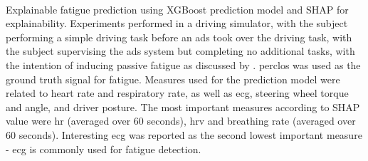 \documentclass[11pt, parskip=half*,twoside=false]{scrbook}
\begin{document}
\paragraph{\citet{zhouPredictingDriverFatigue2021}} Explainable fatigue prediction using XGBoost prediction model and SHAP for explainability.  Experiments performed in a driving simulator, with the subject performing a simple driving task before an \gls{ads} took over the driving task, with the subject supervising the \gls{ads} system but completing no additional tasks, with the intention of inducing passive fatigue as discussed by \citep{goncalvesDrowsinessConditionalAutomation2016}. \gls{perclos} was used as the ground truth signal for fatigue. Measures used for the prediction model were related to heart rate and respiratory rate, as well as \gls{ecg}, steering wheel torque and angle, and driver posture. The most important measures according to SHAP value were \gls{hr} (averaged over 60 seconds), \gls{hrv} and breathing rate (averaged over 60 seconds). Interesting \gls{ecg} was reported as the second lowest important measure - \gls{ecg} is commonly used for fatigue detection.  
	
\end{document}

